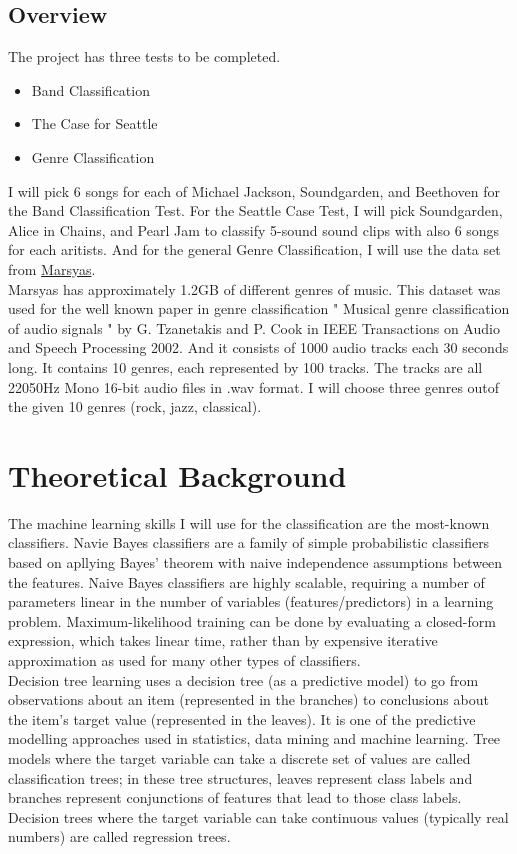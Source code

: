 \documentclass[twoside,twocolumn]{article}
\begin{document}
    \subsection{Overview}
    The project has three tests to be completed.
    \begin{itemize}
        \item Band Classification
        \item The Case for Seattle
        \item Genre Classification
    \end{itemize}
    I will pick 6 songs for each of Michael Jackson, Soundgarden, and Beethoven for the Band Classification Test.
    For the Seattle Case Test, I will pick Soundgarden, Alice in Chains, and Pearl Jam to classify 5-sound sound clips with 
    also 6 songs for each aritists. And for the general Genre Classification, I will use the data set from
    \href{http://marsyasweb.appspot.com/download/data_sets/}{Marsyas}. 
    \\ Marsyas has approximately 1.2GB of different genres of music. This dataset was used for the well known paper in genre 
    classification " Musical genre classification of audio signals " by G. Tzanetakis and P. Cook in IEEE Transactions on 
    Audio and Speech Processing 2002. And it consists of 1000 audio tracks each 30 seconds long. It contains 10 genres, 
    each represented by 100 tracks. The tracks are all 22050Hz Mono 16-bit audio files in .wav format. I will choose three genres
    outof the given 10 genres (rock, jazz, classical).


    \section{Theoretical Background}
    The machine learning skills I will use for the classification are the most-known classifiers. 
    Navie Bayes classifiers are a family of simple probabilistic classifiers based on apllying Bayes' theorem with naive 
    independence assumptions between the features. Naive Bayes classifiers are highly scalable, requiring a number of 
    parameters linear in the number of variables (features/predictors) in a learning problem. Maximum-likelihood training 
    can be done by evaluating a closed-form expression, which takes linear time, rather than by expensive iterative 
    approximation as used for many other types of classifiers. \\
    Decision tree learning uses a decision tree (as a predictive model) to go from observations about 
    an item (represented in the branches) to conclusions about the item's target value (represented in the leaves). 
    It is one of the predictive modelling approaches used in statistics, data mining and machine learning. Tree models 
    where the target variable can take a discrete set of values are called classification trees; in these tree structures, 
    leaves represent class labels and branches represent conjunctions of features that lead to those class labels. 
    Decision trees where the target variable can take continuous values (typically real numbers) are called regression 
    trees.
\end{document}
